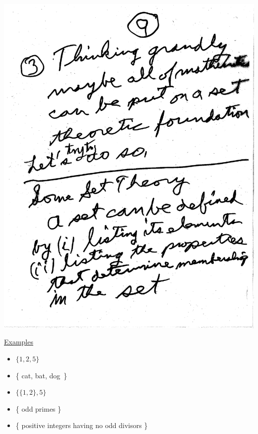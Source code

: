 \documentclass[10pt,a4paper]{article}
\begin{document}
\includegraphics[scale=.5]{Pages/ST_9}

\newpage 

\noindent \underline{Examples}

\vspace{2mm}
\begin{itemize}
\item $\{1,2,5\}$ 
\item \{ cat, bat, dog\ \}
\item $\{\{1,2\},5\}$
\item \{ odd primes \}
\item \{ positive integers having no odd divisors \}
\end{itemize}
\end{document}
